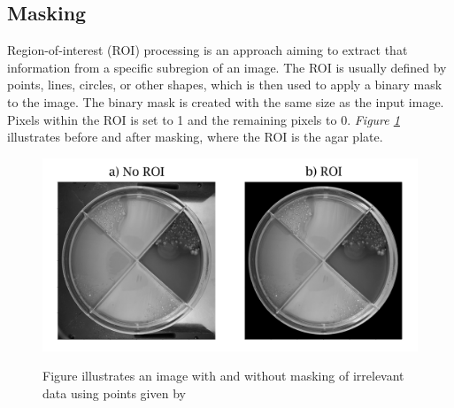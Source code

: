 



\subsection{Masking}
\noindent Region-of-interest (ROI) processing is an approach aiming to extract that information from a specific subregion of an image. The ROI is usually defined by points, lines, circles, or other shapes, which is then used to apply a binary mask to the image. The binary mask is created with the same size as the input image. Pixels within the ROI is set to 1 and the remaining pixels to 0. \textit{Figure \ref{fig:masking}} illustrates before and after masking, where the ROI is the agar plate. \\ 

\begin{figure}[H]
    \centering
    \includegraphics[width=0.8\linewidth]{figures/PDF/ROI.pdf}\\
    \caption{Figure illustrates an image with and without masking of irrelevant data using points given by }
    \label{fig:masking}
\end{figure}

